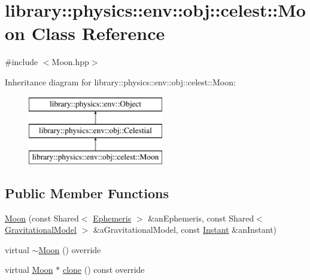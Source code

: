 \hypertarget{classlibrary_1_1physics_1_1env_1_1obj_1_1celest_1_1_moon}{}\section{library\+:\+:physics\+:\+:env\+:\+:obj\+:\+:celest\+:\+:Moon Class Reference}
\label{classlibrary_1_1physics_1_1env_1_1obj_1_1celest_1_1_moon}


{\ttfamily \#include $<$Moon.\+hpp$>$}

Inheritance diagram for library\+:\+:physics\+:\+:env\+:\+:obj\+:\+:celest\+:\+:Moon\+:\begin{figure}[H]
\begin{center}
\leavevmode
\includegraphics[height=3.000000cm]{classlibrary_1_1physics_1_1env_1_1obj_1_1celest_1_1_moon}
\end{center}
\end{figure}
\subsection*{Public Member Functions}
\begin{DoxyCompactItemize}
\item 
\hyperlink{classlibrary_1_1physics_1_1env_1_1obj_1_1celest_1_1_moon_ad6b757c2ca0e9f9b6a733e3ee29e4f23}{Moon} (const Shared$<$ \hyperlink{classlibrary_1_1physics_1_1env_1_1_ephemeris}{Ephemeris} $>$ \&an\+Ephemeris, const Shared$<$ \hyperlink{namespacelibrary_1_1physics_1_1env_1_1obj_1_1celest_ac63145c8cbe868bd79be8f6f423c8cf4}{Gravitational\+Model} $>$ \&a\+Gravitational\+Model, const \hyperlink{classlibrary_1_1physics_1_1time_1_1_instant}{Instant} \&an\+Instant)
\item 
virtual \hyperlink{classlibrary_1_1physics_1_1env_1_1obj_1_1celest_1_1_moon_aef4e99355b923e8c41ec12237bf41ecb}{$\sim$\+Moon} () override
\item 
virtual \hyperlink{classlibrary_1_1physics_1_1env_1_1obj_1_1celest_1_1_moon}{Moon} $\ast$ \hyperlink{classlibrary_1_1physics_1_1env_1_1obj_1_1celest_1_1_moon_a9d922ab338809a6c1052edbe11ce3e60}{clone} () const override
\end{DoxyCompactItemize}
